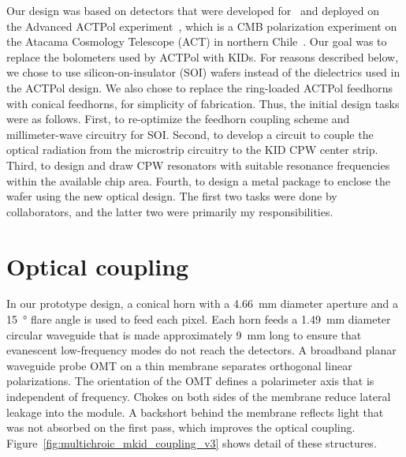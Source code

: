 Our design was based on detectors that were developed for~\autocite{Datta2014JLTP, Henderson2016JLTP, Duff2016JLTP} and deployed on~\autocite{Ho2016JLTP,Datta2016JLTP} the Advanced ACTPol experiment~\autocite{Thornton2016ApJS}, which is a CMB polarization experiment on the Atacama Cosmology Telescope (ACT) in northern Chile~\autocite{ACT2011ApJS}.
Our goal was to replace the bolometers used by ACTPol with KIDs.
For reasons described below, we chose to use silicon-on-insulator (SOI) wafers instead of the dielectrics used in the ACTPol design.
We also chose to replace the ring-loaded ACTPol feedhorns with conical feedhorns, for simplicity of fabrication.
Thus, the initial design tasks were as follows.
First, to re-optimize the feedhorn coupling scheme and millimeter-wave circuitry for SOI.
Second, to develop a circuit to couple the optical radiation from the microstrip circuitry to the KID CPW center strip.
Third, to design and draw CPW resonators with suitable resonance frequencies within the available chip area.
Fourth, to design a metal package to enclose the wafer using the new optical design.
The first two tasks were done by collaborators, and the latter two were primarily my responsibilities.


\section{Optical coupling}
\label{sec:multichroic.optical}

In our prototype design, a conical horn with a \SI{4.66}{mm} diameter aperture and a \SI{15}{\degree} flare angle is used to feed each pixel.
Each horn feeds a \SI{1.49}{mm} diameter circular waveguide that is made approximately \SI{9}{mm} long to ensure that evanescent low-frequency modes do not reach the detectors.
A broadband planar waveguide probe OMT on a thin membrane separates orthogonal linear polarizations.
The orientation of the OMT defines a polarimeter axis that is independent of frequency.
Chokes on both sides of the membrane reduce lateral leakage into the module.
A backshort behind the membrane reflects light that was not absorbed on the first pass, which improves the optical coupling.
Figure~\ref{fig:multichroic_mkid_coupling_v3} shows detail of these structures.

